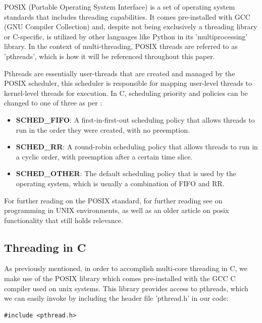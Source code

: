 \documentclass[12pt,a4paper]{article}
\begin{document}
POSIX (Portable Operating System Interface)\parencite{GNUPOSIX,POSIXDocs} is a set of operating system standards that includes threading capabilities. It comes pre-installed with GCC (GNU Compiler Collection)\parencite{GNUPOSIX} and, despite not being exclusively a threading library or C-specific, is utilized by other languages like Python in its 'multiprocessing' library. In the context of multi-threading, POSIX threads are referred to as 'pthreads', which is how it will be referenced throughout this paper.

Pthreads are essentially user-threads that are created and managed by the POSIX scheduler, this scheduler is responsible for mapping user-level threads to kernel-level threads for execution. In C, scheduling priority and policies can be changed to one of three as per \cite[pp. 359-360]{Rauber2023}:

\begin{itemize}
    \item \textbf{SCHED\_FIFO}: A first-in-first-out scheduling policy that allows threads to run in the order they were created, with no preemption.
    \item \textbf{SCHED\_RR}: A round-robin scheduling policy that allows threads to run in a cyclic order, with preemption after a certain time slice.
    \item \textbf{SCHED\_OTHER}: The default scheduling policy that is used by the operating system, which is usually a combination of FIFO and RR.
\end{itemize}

For further reading on the POSIX standard, for further reading see  on programming in UNIX environments, as well as  an older article on posix functionality that still holds relevance.

\subsection{Threading in C}

As previously mentioned, in order to accomplish multi-core threading in C, we make use of the POSIX library which comes pre-installed with the GCC C compiler used on unix systems. This library provides access to pthreads, which we can easily invoke by including the header file 'pthread.h' in our code:

\begin{verbatim}
#include <pthread.h>
\end{verbatim}
\end{document}
